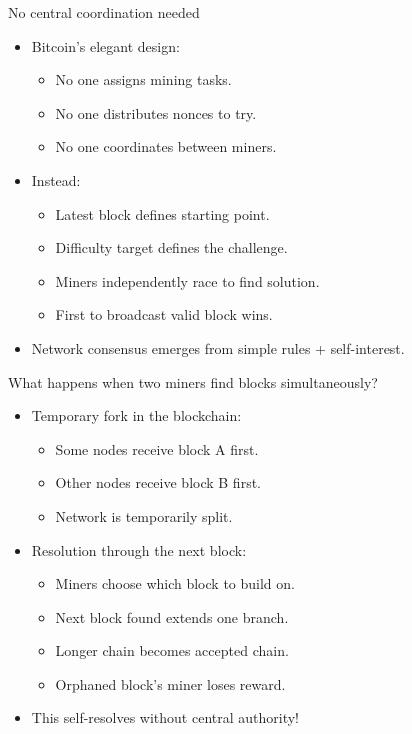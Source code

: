 \documentclass[aspectratio=169, lualatex, handout]{beamer}
\begin{document}
\begin{frame}{No central coordination needed}
	\begin{itemize}
		\item Bitcoin's elegant design:
		      \begin{itemize}
			      \item No one assigns mining tasks.
			      \item No one distributes nonces to try.
			      \item No one coordinates between miners.
		      \end{itemize}
		\item Instead:
		      \begin{itemize}
			      \item Latest block defines starting point.
			      \item Difficulty target defines the challenge.
			      \item Miners independently race to find solution.
			      \item First to broadcast valid block wins.
		      \end{itemize}
		\item Network consensus emerges from simple rules + self-interest.
	\end{itemize}
\end{frame}

\begin{frame}{What happens when two miners find blocks simultaneously?}
	\begin{itemize}
		\item Temporary fork in the blockchain:
		      \begin{itemize}
			      \item Some nodes receive block A first.
			      \item Other nodes receive block B first.
			      \item Network is temporarily split.
		      \end{itemize}
		\item Resolution through the next block:
		      \begin{itemize}
			      \item Miners choose which block to build on.
			      \item Next block found extends one branch.
			      \item Longer chain becomes accepted chain.
			      \item Orphaned block's miner loses reward.
		      \end{itemize}
		\item This self-resolves without central authority!
	\end{itemize}
\end{frame}
\end{document}
